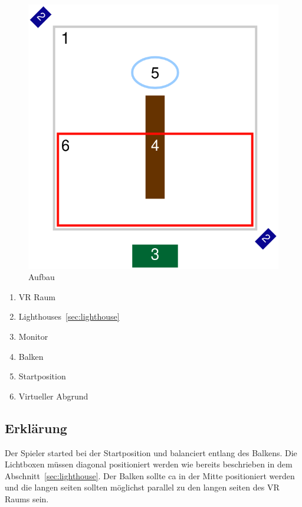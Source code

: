 \begin{figure}
    \centering
    \includegraphics[scale=0.5]{pics/assemlbly}
    \caption{Aufbau}
    \label{fig:assembly}
\end{figure}

\begin{enumerate}
    \item VR Raum
    \item Lighthouses~\ref{sec:lighthouse}
    \item Monitor
    \item Balken
    \item Startposition
    \item Virtueller Abgrund
\end{enumerate}

\subsection{Erklärung}\label{subsec:description}

Der Spieler started bei der Startposition und balanciert entlang des Balkens.
Die Lichtboxen müssen diagonal positioniert werden wie bereits beschrieben in dem Abschnitt~\ref{sec:lighthouse}.
Der Balken sollte ca in der Mitte positioniert werden und die langen seiten sollten möglichst parallel zu den langen seiten des VR Raums sein.

